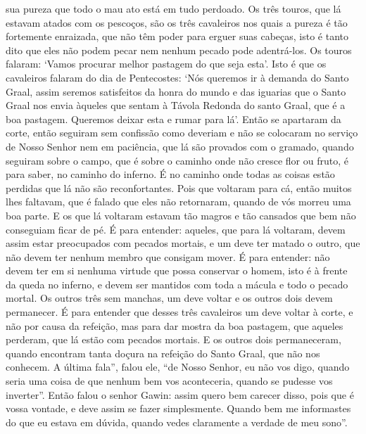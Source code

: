 sua pureza que todo o mau ato está em tudo perdoado. Os três touros, que lá
estavam atados com os pescoços, são os três cavaleiros nos quais a pureza é tão
fortemente enraizada, que não têm poder para erguer suas cabeças, isto é tanto
dito que eles não podem pecar nem nenhum pecado pode adentrá-los. Os touros
falaram: ‘Vamos procurar melhor pastagem do que seja esta’. Isto é que os
cavaleiros falaram do dia de Pentecostes: ‘Nós queremos ir à demanda do Santo
Graal, assim seremos satisfeitos da honra do mundo e das iguarias que o Santo
Graal nos envia àqueles que sentam à Távola Redonda do santo Graal, que é a boa
pastagem. Queremos deixar esta e rumar para lá’. Então se apartaram da corte,
então seguiram sem confissão como deveriam e não se colocaram no serviço de
Nosso Senhor nem em paciência, que lá são provados com o gramado, quando
seguiram sobre o campo, que é sobre o caminho onde não cresce flor ou fruto, é
para saber, no caminho do inferno. É no caminho onde todas as coisas estão
perdidas que lá não são reconfortantes. Pois que voltaram para cá, então muitos
lhes faltavam, que é falado que eles não retornaram, quando de vós morreu uma
boa parte. E os que lá voltaram estavam tão magros e tão cansados que bem não
conseguiam ficar de pé. É para entender: aqueles, que para lá voltaram, devem
assim estar preocupados com pecados mortais, e um deve ter matado o outro, que
não devem ter nenhum membro que consigam mover. É para entender: não devem ter
em si nenhuma virtude que possa conservar o homem, isto é à frente da queda no
inferno, e devem ser mantidos com toda a mácula e todo o pecado mortal. Os
outros três sem manchas, um deve voltar e os outros dois devem permanecer. É
para entender que desses três cavaleiros um deve voltar à corte, e não por causa
da refeição, mas para dar mostra da boa pastagem, que aqueles perderam, que lá
estão com pecados mortais. E os outros dois permaneceram, quando encontram
tanta doçura na refeição do Santo Graal, que não nos conhecem. A última fala”,
falou ele, “de Nosso Senhor,  eu não vos digo, quando seria uma coisa de que
nenhum bem vos aconteceria, quando se pudesse vos inverter”. Então falou o
senhor Gawin: assim quero bem carecer disso, pois que é vossa vontade, e deve
assim se fazer simplesmente. Quando bem me informastes do que eu estava em
dúvida, quando vedes claramente a verdade de meu sono”. 

